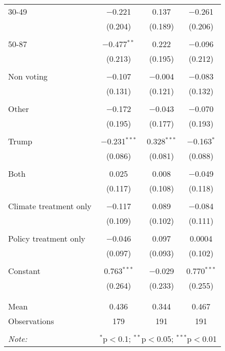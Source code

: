 \begin{tabular}{@{\extracolsep{5pt}}lccc}
 30-49 & $-$0.221 & 0.137 & $-$0.261 \\ 
  & (0.204) & (0.189) & (0.206) \\ 
  & & & \\ 
 50-87 & $-$0.477$^{**}$ & 0.222 & $-$0.096 \\ 
  & (0.213) & (0.195) & (0.212) \\ 
  & & & \\ 
 Non voting & $-$0.107 & $-$0.004 & $-$0.083 \\ 
  & (0.131) & (0.121) & (0.132) \\ 
  & & & \\ 
 Other & $-$0.172 & $-$0.043 & $-$0.070 \\ 
  & (0.195) & (0.177) & (0.193) \\ 
  & & & \\ 
 Trump & $-$0.231$^{***}$ & 0.328$^{***}$ & $-$0.163$^{*}$ \\ 
  & (0.086) & (0.081) & (0.088) \\ 
  & & & \\ 
 Both & 0.025 & 0.008 & $-$0.049 \\ 
  & (0.117) & (0.108) & (0.118) \\ 
  & & & \\ 
 Climate treatment only & $-$0.117 & 0.089 & $-$0.084 \\ 
  & (0.109) & (0.102) & (0.111) \\ 
  & & & \\ 
 Policy treatment only & $-$0.046 & 0.097 & 0.0004 \\ 
  & (0.097) & (0.093) & (0.102) \\ 
  & & & \\ 
 Constant & 0.763$^{***}$ & $-$0.029 & 0.770$^{***}$ \\ 
  & (0.264) & (0.233) & (0.255) \\ 
  & & & \\ 
\hline \\[-1.8ex] 
Mean & 0.436 & 0.344 & 0.467 \\ 
Observations & 179 & 191 & 191 \\ 
\hline 
\hline \\[-1.8ex] 
\textit{Note:}  & \multicolumn{3}{r}{$^{*}$p$<$0.1; $^{**}$p$<$0.05; $^{***}$p$<$0.01} \\ 
\end{tabular} 
